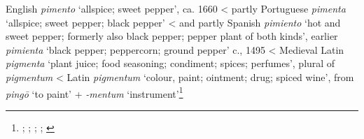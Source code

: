 \begin{etymology}\label{ety:pimento}
English \textit{pimento} `allspice; sweet pepper', ca. 1660
< partly Portuguese \textit{pimenta} `allspice; sweet pepper; black pepper'
< and partly Spanish \textit{pimiento} `hot and sweet pepper; formerly also black pepper; pepper plant of both kinds', earlier \textit{pimienta} `black pepper; peppercorn; ground pepper'  c., 1495
< Medieval Latin \textit{pigmenta} `plant juice; food seasoning; condiment; spices; perfumes', plural of \textit{pigmentum}
< Latin \textit{pigmentum} `colour, paint; ointment; drug; spiced wine', from \textit{pingō} `to paint' + \textit{-mentum} `instrument'\footnote{\textcite[s.v. pimento]{oed}; \textcite[s.v. pimento]{oed}; \textcite[s.v. pimiento]{oed}; \textcites[415]{gomez_de_silva_elseviers_1985}[495]{corominas_breve_1987}; \textcite[s.v. pigmentum]{lewis_latin_1879}}
\end{etymology}